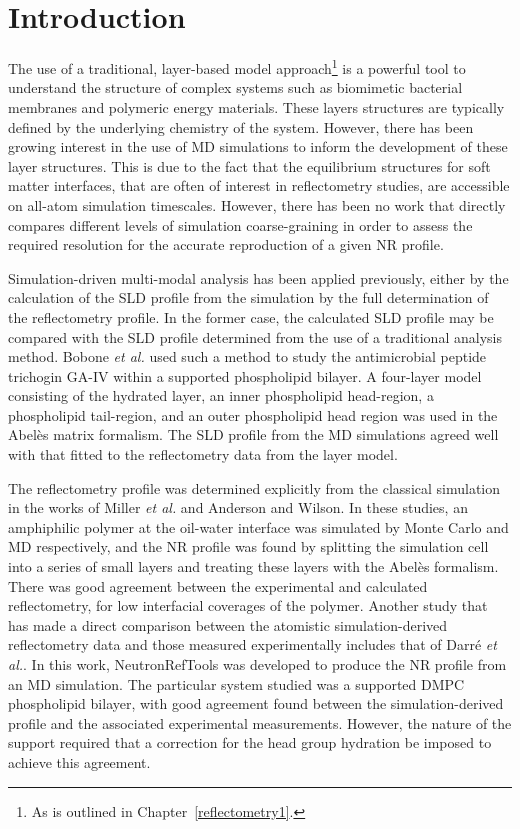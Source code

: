\section{Introduction}
The use of a traditional, layer-based model approach\footnote{As is outlined in Chapter~\ref{reflectometry1}.} is a powerful tool to understand the structure of complex systems such as biomimetic bacterial membranes\autocite{barker_neutron_2016} and polymeric energy materials.\autocite{khodakarimi_x-ray_2016}
These layers structures are typically defined by the underlying chemistry of the system.
However, there has been growing interest in the use of MD simulations to inform the development of these layer structures.
This is due to the fact that the equilibrium structures for soft matter interfaces, that are often of interest in reflectometry studies, are accessible on all-atom simulation timescales.\autocite{scoppola_combining_2018}
However, there has been no work that directly compares different levels of simulation coarse-graining in order to assess the required resolution for the accurate reproduction of a given NR profile.

Simulation-driven multi-modal analysis has been applied previously, either by the calculation of the SLD profile from the simulation by the full determination of the reflectometry profile.
In the former case, the calculated SLD profile may be compared with the SLD profile determined from the use of a traditional analysis method.
Bobone \emph{et al.} used such a method to study the antimicrobial peptide trichogin GA-IV within a supported phospholipid bilayer.\autocite{bobone_membrane_2013}
A four-layer model consisting of the hydrated  layer, an inner phospholipid head-region, a phospholipid tail-region, and an outer phospholipid head region was used in the Abel\`{e}s matrix formalism.
The SLD profile from the MD simulations agreed well with that fitted to the reflectometry data from the layer model.

The reflectometry profile was determined explicitly from the classical simulation in the works of Miller \emph{et al.} and Anderson and Wilson.\autocite{miller_monte_2003,anderson_molecular_2004}
In these studies, an amphiphilic polymer at the oil-water interface was simulated by Monte Carlo and MD respectively, and the NR profile was found by splitting the simulation cell into a series of small layers and treating these layers with the Abel\`{e}s formalism.
There was good agreement between the experimental and calculated reflectometry, for low interfacial coverages of the polymer.
Another study that has made a direct comparison between the atomistic simulation-derived reflectometry data and those measured experimentally includes that of Darr\'{e} \emph{et al.}.\autocite{darre_molecular_2015}
In this work, NeutronRefTools was developed to produce the NR profile from an MD simulation.
The particular system studied was a supported DMPC phospholipid bilayer, with good agreement found between the simulation-derived profile and the associated experimental measurements.
However, the nature of the support required that a correction for the head group hydration be imposed to achieve this agreement.


